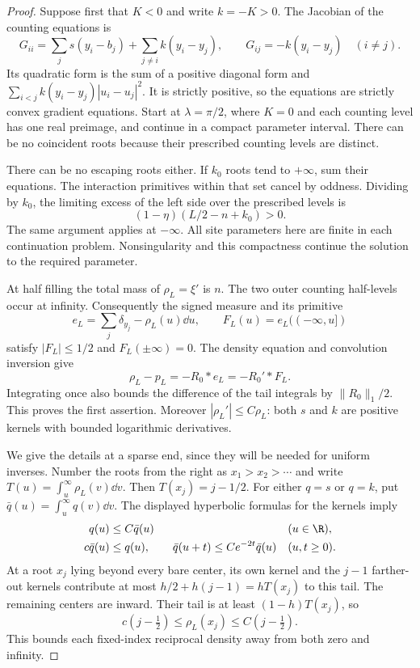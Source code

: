 \begin{proof}
Suppose first that $K<0$ and write $k=-K>0$.  The Jacobian of the
counting equations is
\[
 G_{ii}=\sum_j s(y_i-b_j)+\sum_{j\ne i}k(y_i-y_j),
 \qquad G_{ij}=-k(y_i-y_j)\quad(i\ne j).
\]
Its quadratic form is the sum of a positive diagonal form and
$\sum_{i<j}k(y_i-y_j)|u_i-u_j|^2$.  It is strictly positive,
so the equations are strictly convex gradient equations.
Start at $\lambda=\pi/2$, where $K=0$ and each counting level has
one real preimage, and continue in a compact parameter interval.
There can be no coincident roots because their prescribed counting
levels are distinct.

There can be no escaping roots either.  If $k_0$ roots tend to
$+\infty$, sum their equations.  The interaction primitives within
that set cancel by oddness.  Dividing by $k_0$, the limiting excess
of the left side over the prescribed levels is
\[
 (1-\eta)(L/2-n+k_0)>0.
\]
The same argument applies at $-\infty$.  All site parameters here
are finite in each continuation problem.  Nonsingularity and this
compactness continue the solution to the required parameter.

At half filling the total mass of $\rho_L=\xi'$ is $n$.
The two outer counting half-levels occur at infinity.  Consequently
the signed measure and its primitive
\[
 e_L=\sum_j\delta_{y_j}-\rho_L(u)\dd u,\qquad
 F_L(u)=e_L((-\infty,u])
\]
satisfy $|F_L|\le1/2$ and $F_L(\pm\infty)=0$.
The density equation and convolution inversion give
\begin{equation}\label{eq:counting-sawtooth}
 \rho_L-p_L=-R_0*e_L=-R_0'*F_L.
\end{equation}
Integrating once also bounds the difference of the tail integrals
by $\|R_0\|_1/2$.  This proves the first assertion.  Moreover
$|\rho_L'|\le C\rho_L$: both $s$ and $k$ are positive kernels
with bounded logarithmic derivatives.

We give the details at a sparse end, since they will be needed for
uniform inverses.  Number the roots from the right as
$x_1>x_2>\cdots$ and write
$T(u)=\int_u^\infty\rho_L(v)\dd v$.  Then
$T(x_j)=j-1/2$.  For either $q=s$ or $q=k$, put
$\bar q(u)=\int_u^\infty q(v)\dd v$.
The displayed hyperbolic formulas for the kernels imply
\begin{align}
 q(u)&\le C\bar q(u) &&(u\in\R),\notag\\
 c\bar q(u)&\le q(u),\qquad
 \bar q(u+t)\le C e^{-2t}\bar q(u)
 &&(u,t\ge0).
 \label{eq:kernel-tail-comparison}
\end{align}
At a root $x_j$ lying beyond every bare center, its own kernel and
the $j-1$ farther-out kernels contribute at most
$h/2+h(j-1)=hT(x_j)$ to this tail.  The remaining centers are
inward.  Their tail is at least $(1-h)T(x_j)$, so
\begin{equation}\label{eq:edge-index-density}
 c(j-\tfrac12)\le\rho_L(x_j)\le C(j-\tfrac12).
\end{equation}
This bounds each fixed-index reciprocal density away from both
zero and infinity.


\end{proof}
